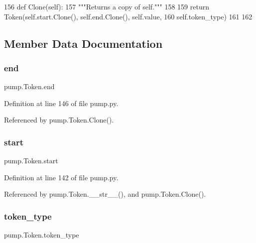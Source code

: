 \begin{DoxyCode}
156   \textcolor{keyword}{def }Clone(self):
157     \textcolor{stringliteral}{"""Returns a copy of self."""}
158 
159     \textcolor{keywordflow}{return} Token(self.start.Clone(), self.end.Clone(), self.value,
160                  self.token\_type)
161 
162 
\end{DoxyCode}


\subsection{Member Data Documentation}
\mbox{\label{classpump_1_1Token_abb88c0ece4274cfd974fd01d0468953c}} 
\subsubsection{\texorpdfstring{end}{end}}
{\footnotesize\ttfamily pump.\+Token.\+end}



Definition at line 146 of file pump.\+py.



Referenced by pump.\+Token.\+Clone().

\mbox{\label{classpump_1_1Token_a53e3333a770bc8773224a5af78bca5bb}} 
\subsubsection{\texorpdfstring{start}{start}}
{\footnotesize\ttfamily pump.\+Token.\+start}



Definition at line 142 of file pump.\+py.



Referenced by pump.\+Token.\+\_\+\+\_\+str\+\_\+\+\_\+(), and pump.\+Token.\+Clone().

\mbox{\label{classpump_1_1Token_aeac105b76f6af13c8c64ba0a94e37d90}} 
\subsubsection{\texorpdfstring{token\+\_\+type}{token\_type}}
{\footnotesize\ttfamily pump.\+Token.\+token\+\_\+type}



